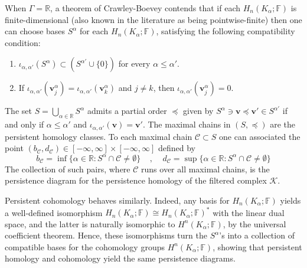 \documentclass[11pt]{article}
\theoremstyle{definition}
\theoremstyle{remark}
\newcommand{\RR}{\mathbb{R}}
\newcommand{\FF}{\mathbb{F}}
\begin{document}
    When $\Gamma = \RR$,  a theorem of Crawley-Boevey \cite{crawley2015decomposition} contends  that if each
    $H_n(K_\alpha; \FF)$ is finite-dimensional (also known in the literature as being pointwise-finite)
    then one can choose bases $S^\alpha$ for each $H_n(K_\alpha ; \FF)$, satisfying the following compatibility condition:
    \begin{enumerate}
    \item $\iota_{\alpha,\alpha'}(S^\alpha) \subset \left(S^{\alpha'} \cup \{0\}\right)$ for every $\alpha \leq \alpha'$.
    \item If $\iota_{\alpha,\alpha'}(\mathbf{v}_j^\alpha) = \iota_{\alpha,\alpha'}(\mathbf{v}_k^\alpha)$ and $j\neq k$, then
    $\iota_{\alpha,\alpha'}(\mathbf{v}_j^\alpha) = 0$.
    \end{enumerate}
    The set $S = \bigcup\limits_{\alpha \in \RR}S^\alpha$ admits a partial order $\preceq$ given by
    $S^\alpha \ni \mathbf{v} \preceq \mathbf{v}' \in  S^{\alpha'}$
    if and only if $\alpha \leq \alpha'$ and $\iota_{\alpha,\alpha'}(\mathbf{v}) = \mathbf{v}'$.
    The maximal chains in $(S,\preceq)$ are the persistent homology classes.
    To each maximal chain $\mathscr{C} \subset S$ one can associated the point $(b_\mathscr{C}, d_\mathscr{C}) \in [-\infty, \infty] \times [-\infty, \infty]$
      defined by
    \[
    b_{\mathscr{C}} = \inf\{\alpha \in \RR : S^\alpha \cap \mathscr{C}\neq \emptyset\}
    \;\;\;\; ,
    \;\;\;\;
    d_{\mathscr{C}} = \sup\{\alpha \in \RR : S^\alpha \cap \mathscr{C}\neq \emptyset\}
    \]
    The collection of such pairs, where $\mathscr{C}$ runs over all maximal chains, is the persistence diagram for the persistence homology of the filtered
    complex $\mathcal{K}$.

    Persistent cohomology behaves similarly. Indeed, any basis for $H_n(K_\alpha ; \FF)$ yields a well-defined isomorphism
    $H_n(K_\alpha; \FF) \cong H_n(K_\alpha;\FF)^*$ with the linear dual space,
    and the latter is naturally isomorphic to $H^n(K_\alpha ; \FF)$, by the universal coefficient theorem.
    Hence, these isomorphisms turn the $S^\alpha$'s into a collection of compatible bases for the
    cohomology groups $H^n(K_\alpha; \FF)$, showing that persistent homology and cohomology yield the same persistence diagrams.
\end{document}
